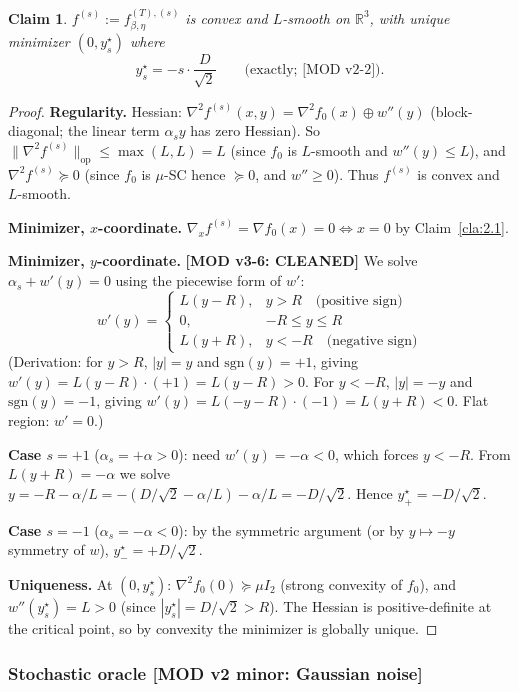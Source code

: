 \documentclass[11pt,a4paper]{article}
\theoremstyle{plain}
\newtheorem{claim}[theorem]{Claim}
\theoremstyle{definition}
\theoremstyle{remark}
\newcommand{\R}{\mathbb{R}}
\begin{document}
\begin{claim}
\label{cla:2.2}
$f^{(s)} := f_{\beta,\eta}^{(T),(s)}$ is convex and $L$-smooth on $\R^3$, with unique minimizer $(0, y^\star_s)$ where
\[
y^\star_s = -s \cdot \frac{D}{\sqrt 2}\qquad \text{(exactly; [MOD v2-2])}.
\]
\end{claim}

\begin{proof}
\textbf{Regularity.} Hessian: $\nabla^2 f^{(s)}(x,y) = \nabla^2 f_0(x) \oplus w''(y)$ (block-diagonal; the linear term $\alpha_s y$ has zero Hessian). So $\|\nabla^2 f^{(s)}\|_{\mathrm{op}} \leq \max(L, L) = L$ (since $f_0$ is $L$-smooth and $w''(y) \leq L$), and $\nabla^2 f^{(s)} \succeq 0$ (since $f_0$ is $\mu$-SC hence $\succeq 0$, and $w'' \geq 0$). Thus $f^{(s)}$ is convex and $L$-smooth.

\textbf{Minimizer, $x$-coordinate.} $\nabla_x f^{(s)} = \nabla f_0(x) = 0 \iff x = 0$ by Claim~\ref{cla:2.1}.

\textbf{Minimizer, $y$-coordinate.} \textbf{[MOD v3-6: CLEANED]} We solve $\alpha_s + w'(y) = 0$ using the piecewise form of $w'$:
\[
w'(y) = \begin{cases}L(y - R), & y > R \quad \text{(positive sign)} \\ 0, & -R \leq y \leq R \\ L(y + R), & y < -R \quad \text{(negative sign)}\end{cases}
\]
(Derivation: for $y > R$, $|y| = y$ and $\mathrm{sgn}(y) = +1$, giving $w'(y) = L(y-R)\cdot(+1) = L(y-R) > 0$. For $y < -R$, $|y| = -y$ and $\mathrm{sgn}(y) = -1$, giving $w'(y) = L(-y-R)\cdot(-1) = L(y+R) < 0$. Flat region: $w' = 0$.)

\textbf{Case $s = +1$} ($\alpha_s = +\alpha > 0$): need $w'(y) = -\alpha < 0$, which forces $y < -R$. From $L(y + R) = -\alpha$ we solve $y = -R - \alpha/L = -(D/\sqrt 2 - \alpha/L) - \alpha/L = -D/\sqrt 2$. Hence $y^\star_{+} = -D/\sqrt 2$.

\textbf{Case $s = -1$} ($\alpha_s = -\alpha < 0$): by the symmetric argument (or by $y \mapsto -y$ symmetry of $w$), $y^\star_{-} = +D/\sqrt 2$.

\textbf{Uniqueness.} At $(0, y^\star_s)$: $\nabla^2 f_0(0) \succeq \mu I_2$ (strong convexity of $f_0$), and $w''(y^\star_s) = L > 0$ (since $|y^\star_s| = D/\sqrt 2 > R$). The Hessian is positive-definite at the critical point, so by convexity the minimizer is globally unique.
\end{proof}

\subsubsection{Stochastic oracle \textbf{[MOD v2 minor: Gaussian noise]}}
\end{document}

